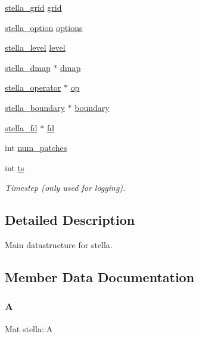\begin{DoxyCompactItemize}
\item 
\mbox{\hyperlink{structstella__grid}{stella\+\_\+grid}} \mbox{\hyperlink{structstella_adae4ed751e9c9791ef5af4eb459a3761}{grid}}
\item 
\mbox{\hyperlink{structstella__option}{stella\+\_\+option}} \mbox{\hyperlink{structstella_a8d0ae54054c80ff5762f183c45c21939}{options}}
\item 
\mbox{\hyperlink{structstella__level}{stella\+\_\+level}} \mbox{\hyperlink{structstella_a67297e1354ac246b9150d546c4db65af}{level}}
\item 
\mbox{\hyperlink{structstella__dmap}{stella\+\_\+dmap}} $\ast$ \mbox{\hyperlink{structstella_aa9dd28e08c583f4b2232f74d6d440395}{dmap}}
\item 
\mbox{\hyperlink{stella__operator_8h_a8b2b26003faf225af5fdf72f1b7f1783}{stella\+\_\+operator}} $\ast$ \mbox{\hyperlink{structstella_aa0964f9d0ea3d925fbb938489336499b}{op}}
\item 
\mbox{\hyperlink{structstella__boundary}{stella\+\_\+boundary}} $\ast$ \mbox{\hyperlink{structstella_a0ff53b3335986ac428d5adaaf43acdfe}{boundary}}
\item 
\mbox{\hyperlink{structstella__fd}{stella\+\_\+fd}} $\ast$ \mbox{\hyperlink{structstella_a2b9a931f9cf44797836bb26724063467}{fd}}
\item 
int \mbox{\hyperlink{structstella_af60ea7b3a8326d7bbc5c336e8c5f133b}{num\+\_\+patches}}
\item 
int \mbox{\hyperlink{structstella_acc8da3f8945e90877d65acb6d89e3e09}{ts}}
\begin{DoxyCompactList}\small\item\em Timestep (only used for logging). \end{DoxyCompactList}\end{DoxyCompactItemize}


\subsection{Detailed Description}
Main datastructure for stella. 

\subsection{Member Data Documentation}
\mbox{\label{structstella_a09d8cdb7d92810c812f7d698a0f1a4b4}} 
\subsubsection{\texorpdfstring{A}{A}}
{\footnotesize\ttfamily Mat stella\+::A}



